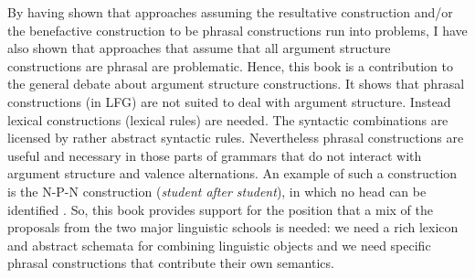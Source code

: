 By having shown that approaches assuming the resultative construction and/or the benefactive
construction to be phrasal constructions run into problems, I have also shown that approaches that
assume that all argument structure constructions are phrasal are problematic. Hence, this book is a
contribution to the general debate about argument structure constructions. It shows that phrasal
constructions (in LFG) are not suited to deal with argument structure. Instead lexical constructions
(lexical rules) are needed. The syntactic combinations are licensed by rather abstract syntactic
rules. Nevertheless phrasal constructions are useful and necessary in those parts of grammars that
do not interact with argument structure and valence alternations. An example of such a construction
is the N-P-N construction (\emph{student after student}), in which no head can be identified
\citep{Jackendoff2008a}. So, this book provides support for the position that a mix of the proposals
from the two major linguistic schools is needed: we need a rich lexicon and abstract schemata for
combining linguistic objects and we need specific phrasal constructions that contribute their own semantics.





















